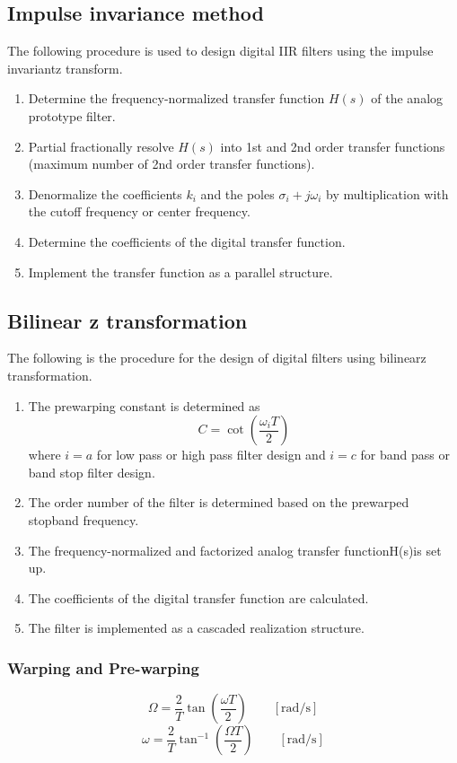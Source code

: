 \subsection{Impulse invariance method}
The following procedure is used to design digital IIR filters using the impulse invariantz transform.
\begin{enumerate}
  \item Determine the frequency-normalized transfer function $H(s)$ of the analog prototype filter.
  \item Partial fractionally resolve $H(s)$ into 1st and 2nd order transfer functions (maximum number of 2nd order transfer functions).
  \item Denormalize the coefficients $k_i$ and the poles $\sigma_i+j\omega_i$ by multiplication with the cutoff frequency or center frequency.
  \item Determine the coefficients of the digital transfer function.
  \item Implement the transfer function as a parallel structure.
\end{enumerate}
\subsection{Bilinear z transformation}
The following is the procedure for the design of digital filters using bilinearz transformation.
\begin{enumerate}
  \item The prewarping constant is determined as
    $$C=\cot\left(\frac{\omega_iT}{2}\right)$$
    where $i=a$ for low pass or high pass filter design and $i=c$ for band pass or band stop filter design.
  \item The order number of the filter is determined based on the prewarped stopband frequency.
  \item The frequency-normalized and factorized analog transfer functionH(s)is set up.
  \item The coefficients of the digital transfer function are calculated.
  \item The filter is implemented as a cascaded realization structure.
\end{enumerate}
\subsubsection{Warping and Pre-warping}
$$\Omega={\frac{2}{T}}\tan\left({\frac{\omega T}{2}}\right)\qquad\mathrm{\left[rad/s\right]}$$
$$\omega={\frac{2}{T}}\tan^{-1}\left({\frac{\Omega T}{2}}\right)\qquad\mathrm{\left[rad/s\right]}$$

